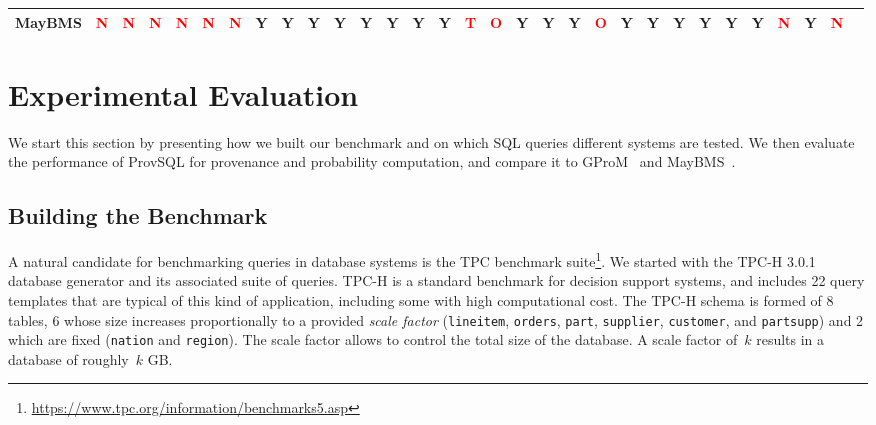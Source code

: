 \begin{table}
{\begin{tabular}{rcccccccccccccccccccccccccccccc}
			MayBMS          & \textcolor{red}{N}          & \textcolor{red}{N}         & \textcolor{red}{N} & \textcolor{red}{N} & \textcolor{red}{N} & \textcolor{red}{N} & Y & Y & Y                  & Y  & Y  & Y                  & Y & Y & \textcolor{red}{T} & \textcolor{red}{O} & Y                  & Y & Y                  & \textcolor{red}{O} & Y  & Y  & Y                  & Y  & Y  & Y  & \textcolor{red}{N} & Y  & \textcolor{red}{N} \\
			\bottomrule
		\end{tabular}
	}
\end{table}


\section{Experimental Evaluation}\label{sec:experiments}

We start this section by presenting how we built our benchmark and on
which SQL queries different systems are tested. We then evaluate the performance of ProvSQL for provenance and probability computation, and compare it to GProM~\cite{bahareh2018gprom} and MayBMS~\cite{huang2009maybms}.

\subsection{Building the Benchmark}

A natural candidate for benchmarking queries in database systems is the
TPC benchmark
suite\footnote{\url{https://www.tpc.org/information/benchmarks5.asp}}. We
started with the \mbox{TPC-H} 3.0.1 database generator and its associated suite
of queries. TPC-H is a standard benchmark for decision support systems,
and includes 22 query templates that are typical of this kind of
application, including some with high computational cost.
The TPC-H schema is formed of 8 tables, 6 whose size increases proportionally
to a provided \emph{scale factor} (\texttt{lineitem}, \texttt{orders},
\texttt{part}, \texttt{supplier}, \texttt{customer}, and
\texttt{partsupp}) and 2 which are fixed (\texttt{nation} and
\texttt{region}). The scale factor allows to control the total size of
the database. A scale factor of~$k$ results in a database of roughly~$k$
GB.

